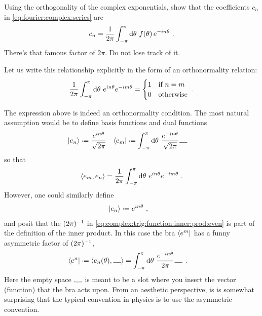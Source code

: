 \begin{exercise}
Using the orthogonality of the complex exponentials, show that the coefficients $c_n$ in \eqref{eq:fourier:complex:series} are
\begin{align}
    c_n = \frac{1}{2\pi}\int_{-\pi}^\pi \operatorname{d}\mkern-3mu^{}\mkern-1mu{\theta}\,\, f(\theta)\, e^{-in\theta} \ .
\end{align}
There's that famous factor of $2\pi$. Do not lose track of it.
\end{exercise}

Let us write this relationship explicitly in the form of an orthonormality relation:
\begin{align}
    \frac{1}{2\pi}
    \int_{-\pi}^\pi \operatorname{d}\mkern-3mu^{}\mkern-1mu{\theta}\, \,
    {e^{in\theta}}
    {e^{-im\theta}}
    = 
    \begin{cases}
    1 &\textnormal{if } n=m\\
    0 &\textnormal{otherwise}
    \end{cases}
    \ .
\end{align}
\begin{example}
The expression above is indeed an orthonormality condition. The most natural assumption would be to define basis functions and dual functions
\begin{align}
    \ket{e_n} &\defeq \frac{e^{in\theta}}{\sqrt{2\pi}}
    &
    \bra{e_m} &\defeq 
    \int_{-\pi}^\pi \D{\theta} \, 
    \frac{e^{-in\theta}}{\sqrt{2\pi}}
    \Vtextvisiblespace[1em]{} \,
\end{align}
so that
\begin{align}
    \langle e_m, e_n \rangle 
    =
    \frac{1}{2\pi}
    \int_{-\pi}^\pi \operatorname{d}\mkern-3mu^{}\mkern-1mu{\theta}\, \,
    {e^{in\theta}}
    {e^{-im\theta}}
     \ .
     \label{eq:complex:trig:function:inner:prod:even}
\end{align}
However, one could similarly define
\begin{align}
    \ket{e_n} &\defeq {e^{in\theta}}\ ,
\end{align} 
and posit that the $(2\pi)^{-1}$ in \eqref{eq:complex:trig:function:inner:prod:even} is part of the definition of the inner product. In this case the bra $\left\langle e^m\right|$ has a funny asymmetric factor of $(2\pi)^{-1}$,
\begin{align}
    \bra{e^n} &\defeq \la e_n(\theta), \Vtextvisiblespace[1em]{} \ra 
    =
    \int_{-\pi}^\pi \D{\theta} \,
     \frac
    {e^{-in\theta}}
     {{2\pi}}
     \Vtextvisiblespace[1em]{} \,
    \ .
\end{align}
Here the empty space $\Vtextvisiblespace[1em]{}$ is meant to be a slot where you insert the vector (function) that the bra acts upon. From an aesthetic perspective, is is somewhat surprising that the typical convention in physics is to use the asymmetric convention.
\end{example}
